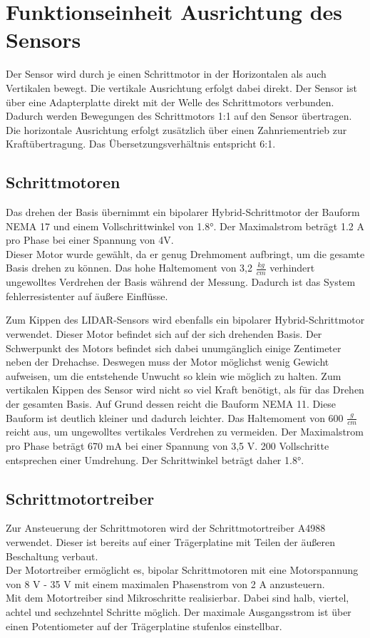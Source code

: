  

\section{Funktionseinheit Ausrichtung des Sensors}

Der Sensor wird durch je einen Schrittmotor in der Horizontalen als auch Vertikalen bewegt. Die vertikale Ausrichtung erfolgt dabei direkt. Der Sensor ist über eine Adapterplatte direkt mit der Welle des Schrittmotors verbunden. Dadurch werden Bewegungen des Schrittmotors 1:1 auf den Sensor übertragen.\\
Die horizontale Ausrichtung erfolgt zusätzlich über einen Zahnriementrieb zur Kraftübertragung. Das Übersetzungsverhältnis entspricht 6:1. 

\subsection{Schrittmotoren}
Das drehen der Basis übernimmt ein bipolarer Hybrid-Schrittmotor der Bauform \ac{NEMA} 17 und einem Vollschrittwinkel von 1.8°. Der Maximalstrom beträgt 1.2 A pro Phase bei einer Spannung von 4V.\\
Dieser Motor wurde gewählt, da er genug Drehmoment aufbringt, um die gesamte Basis drehen zu können. Das hohe Haltemoment von 3,2 $\frac{kg}{cm}$ verhindert ungewolltes Verdrehen der Basis während der Messung. Dadurch ist das System fehlerresistenter auf äußere Einflüsse. \cite{NEMA17}


Zum Kippen des \ac{LIDAR}-Sensors wird ebenfalls ein bipolarer Hybrid-Schrittmotor verwendet. Dieser Motor befindet sich auf der sich drehenden Basis. Der Schwerpunkt des Motors befindet sich dabei unumgänglich einige Zentimeter neben der Drehachse. Deswegen muss der Motor möglichst wenig Gewicht aufweisen, um die entstehende Unwucht so klein wie möglich zu halten.
Zum vertikalen Kippen des Sensor wird nicht so viel Kraft benötigt, als für das Drehen der gesamten Basis. Auf Grund dessen reicht die Bauform \ac{NEMA} 11. Diese Bauform ist deutlich kleiner und dadurch leichter.
Das Haltemoment von 600 $\frac{g}{cm}$ reicht aus, um ungewolltes vertikales Verdrehen zu vermeiden. Der Maximalstrom pro Phase beträgt 670 mA bei einer Spannung von 3,5 V. 200 Vollschritte entsprechen einer Umdrehung. Der Schrittwinkel beträgt daher 1.8°. \cite{NEMA11}


\subsection{Schrittmotortreiber}
Zur Ansteuerung der Schrittmotoren wird der Schrittmotortreiber A4988 verwendet. Dieser ist bereits auf einer Trägerplatine mit Teilen der äußeren Beschaltung verbaut.\\
Der Motortreiber ermöglicht es, bipolar Schrittmotoren mit eine Motorspannung von 8 V - 35 V mit einem maximalen Phasenstrom von 2 A anzusteuern. \cite{A4988}\\
Mit dem Motortreiber sind Mikroschritte realisierbar. Dabei sind halb, viertel, achtel und sechzehntel Schritte möglich. Der maximale Ausgangsstrom ist über einen Potentiometer auf der Trägerplatine stufenlos einstellbar. 


